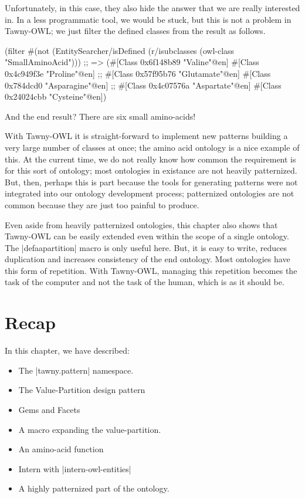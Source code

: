 Unfortunately, in this case, they also hide the answer that we are really
interested in. In a less programmatic tool, we would be stuck, but this is not
a problem in Tawny-OWL; we just filter the defined classes from the result as
follows.

\begin{tawny}
(filter
 #(not (EntitySearcher/isDefined %
 (r/isubclasses
  (owl-class "SmallAminoAcid")))
;; => (#[Class 0x6f148b89 "Valine"@en] #[Class 0x4c949f3e "Proline"@en]
;;     #[Class 0x57f95b76 "Glutamate"@en] #[Class 0x784dcd0 "Asparagine"@en]
;;     #[Class 0x4c07576a "Aspartate"@en] #[Class 0x24024cbb "Cysteine"@en])
\end{tawny}

And the end result? There are six small amino-acids!

With Tawny-OWL it is straight-forward to implement new patterns building a
very large number of classes at once; the amino acid ontology is a nice
example of this. At the current time, we do not really know how common the
requirement is for this sort of ontology; most ontologies in existance are not
heavily patternized. But, then, perhaps this is part because the tools for
generating patterns were not integrated into our ontology development process;
patternized ontologies are not common because they are just too painful to
produce.

Even aside from heavily patternized ontologies, this chapter also shows that
Tawny-OWL can be easily extended even within the scope of a single ontology.
The |defaapartition| macro is only useful here. But, it is easy to write,
reduces duplication and increases consistency of the end ontology. Most
ontologies have this form of repetition. With Tawny-OWL, managing this
repetition becomes the task of the computer and not the task of the human,
which is as it should be.

\section{Recap}
\label{sec:recap-amino-acid}

In this chapter, we have described:

\begin{itemize}
\item The |tawny.pattern| namespace.
\item The Value-Partition design pattern
\item Gems and Facets
\item A macro expanding the value-partition.
\item An amino-acid function
\item Intern with |intern-owl-entities|
\item A highly patternized part of the ontology.
\end{itemize}
